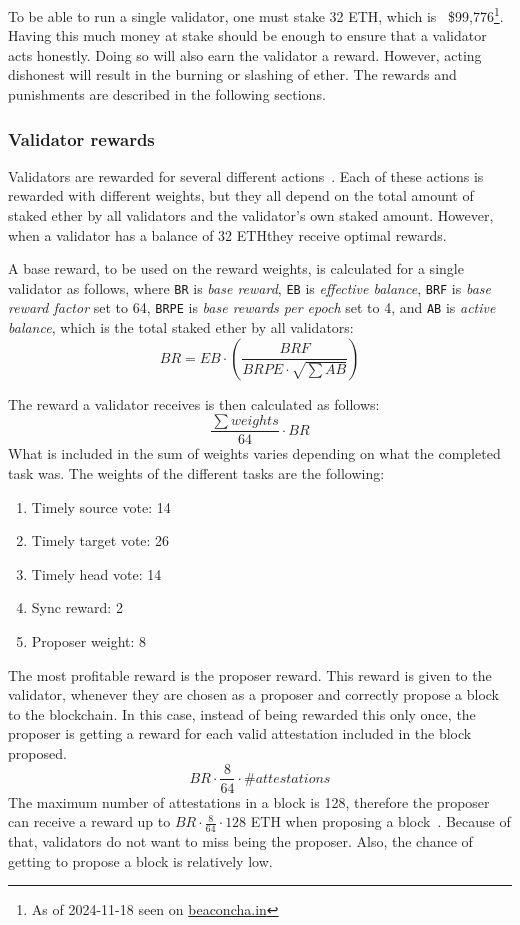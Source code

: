 To be able to run a single validator, one must stake 32 ETH,
which is ~\$99,776\footnote{As of 2024-11-18 seen on \href{https://beaconcha.in/}{beaconcha.in}}.
Having this much money at stake should be enough to ensure that a validator acts honestly.
Doing so will also earn the validator a reward.
However, acting dishonest will result in the burning or slashing of ether.
The rewards and punishments are described in the following sections.
\subsubsection{Validator rewards}\label{subsubsec:valrewards}
Validators are rewarded for several different actions~\cite{PoSRewAndPen}.
Each of these actions is rewarded with different weights,
but they all depend on the total amount of staked ether by all validators and the validator's own staked amount.
However, when a validator has a balance of 32 ETH\@ they receive optimal rewards.

A base reward, to be used on the reward weights, is calculated for a single validator as follows, where \texttt{BR} is \textit{base reward}, \texttt{EB} is \textit{effective balance}, \texttt{BRF} is \textit{base reward factor} set to 64,
\texttt{BRPE} is \textit{base rewards per epoch} set to 4,
and \texttt{AB} is \textit{active balance}, which is the total staked ether by all validators:
\begin{equation}
    BR = EB\cdot(\frac{BRF}{BRPE\cdot \sqrt{\sum{AB}}})
    \label{eq:basereward}
\end{equation}


The reward a validator receives is then calculated as follows:
\begin{equation}
    \frac{\sum{weights}}{64}\cdot BR
    \label{eq:valrewards}
\end{equation}
What is included in the sum of weights varies depending on what the completed task was.
The weights of the different tasks are the following:
\begin{enumerate}
    \item Timely source vote: 14
    \item Timely target vote: 26
    \item Timely head vote: 14
    \item Sync reward: 2
    \item Proposer weight: 8
\end{enumerate}
The most profitable reward is the proposer reward.
This reward is given to the validator, whenever they are chosen as a proposer and correctly propose a block to the blockchain.
In this case, instead of being rewarded this only once,
the proposer is getting a reward for each valid attestation included in the block proposed.
\begin{equation}
    BR\cdot\frac{8}{64}\cdot \#attestations\label
    {eq:propreward}
\end{equation}
The maximum number of attestations in a block is 128, therefore the proposer can receive a reward up to $BR\cdot\frac{8}{64}\cdot128$ ETH when proposing a block~\cite{PoSRewAndPen,consensus-spec-phase-0}.
Because of that, validators do not want to miss being the proposer.
Also, the chance of getting to propose a block is relatively low.

